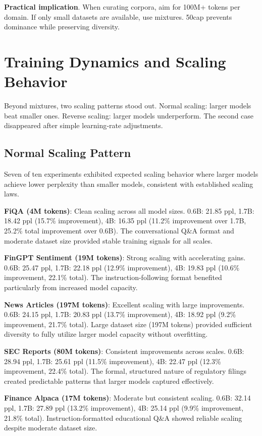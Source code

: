 \textbf{Practical implication}. When curating corpora, aim for 100M+ tokens per domain. If only small datasets are available, use mixtures. 50cap prevents dominance while preserving diversity.

\section{Training Dynamics and Scaling Behavior}

Beyond mixtures, two scaling patterns stood out. Normal scaling: larger models beat smaller ones. Reverse scaling: larger models underperform. The second case disappeared after simple learning‑rate adjustments.

\subsection{Normal Scaling Pattern}

Seven of ten experiments exhibited expected scaling behavior where larger models achieve lower perplexity than smaller models, consistent with established scaling laws.

\textbf{FiQA (4M tokens)}: Clean scaling across all model sizes. 0.6B: 21.85 ppl, 1.7B: 18.42 ppl (15.7\% improvement), 4B: 16.35 ppl (11.2\% improvement over 1.7B, 25.2\% total improvement over 0.6B). The conversational Q\&A format and moderate dataset size provided stable training signals for all scales.

\textbf{FinGPT Sentiment (19M tokens)}: Strong scaling with accelerating gains. 0.6B: 25.47 ppl, 1.7B: 22.18 ppl (12.9\% improvement), 4B: 19.83 ppl (10.6\% improvement, 22.1\% total). The instruction-following format benefited particularly from increased model capacity.

\textbf{News Articles (197M tokens)}: Excellent scaling with large improvements. 0.6B: 24.15 ppl, 1.7B: 20.83 ppl (13.7\% improvement), 4B: 18.92 ppl (9.2\% improvement, 21.7\% total). Large dataset size (197M tokens) provided sufficient diversity to fully utilize larger model capacity without overfitting.

\textbf{SEC Reports (80M tokens)}: Consistent improvements across scales. 0.6B: 28.94 ppl, 1.7B: 25.61 ppl (11.5\% improvement), 4B: 22.47 ppl (12.3\% improvement, 22.4\% total). The formal, structured nature of regulatory filings created predictable patterns that larger models captured effectively.

\textbf{Finance Alpaca (17M tokens)}: Moderate but consistent scaling. 0.6B: 32.14 ppl, 1.7B: 27.89 ppl (13.2\% improvement), 4B: 25.14 ppl (9.9\% improvement, 21.8\% total). Instruction-formatted educational Q\&A showed reliable scaling despite moderate dataset size.


